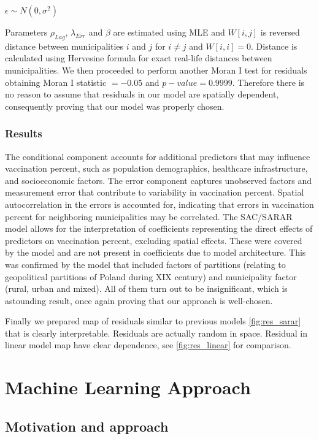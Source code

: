 \documentclass[a4paper,12pt]{article} %
\begin{document}
$ \epsilon \sim N(0,\sigma^2)$

Parameters $\rho_{Lag}$, $ \lambda _{Err}$ and $\beta$ are estimated using MLE and $W[i,j]$ is reversed distance between municipalities $i$ and $j$ for $i \neq j$ and $W[i,i] = 0$. Distance is calculated using Hervesine formula for exact real-life distances between municipalities. We then proceeded to perform another Moran I test for residuals obtaining Moran I statistic $= -0.05$ and $p-value = 0.9999$. Therefore there is no reason to assume that residuals in our model are spatially dependent, consequently proving that our model was properly chosen. 

\subsubsection{Results}

The conditional component accounts for additional predictors that may influence vaccination percent, such as population demographics, healthcare infrastructure, and socioeconomic factors.  The error component captures unobserved factors and measurement error that contribute to variability in vaccination percent. Spatial autocorrelation in the errors is accounted for, indicating that errors in vaccination percent for neighboring municipalities may be correlated. The SAC/SARAR model allows for the interpretation of coefficients representing the direct effects of predictors on vaccination percent, excluding spatial effects. These were covered by the model and are not present in coefficients due to model architecture. This was confirmed by the model that included factors of partitions (relating to geopolitical partitions of Poland during XIX century) and municipality factor (rural, urban and mixed). All of them turn out to be insignificant, which is astounding result, once again proving that our approach is well-chosen.

Finally we prepared map of residuals similar to previous models \ref{fig:res_sarar} that is clearly interpretable. Residuals are actually random in space. Residual in linear model map have clear dependence, see \ref{fig:res_linear} for comparison.


\newpage
\section{Machine Learning Approach}
\subsection{Motivation and approach}
\end{document}
